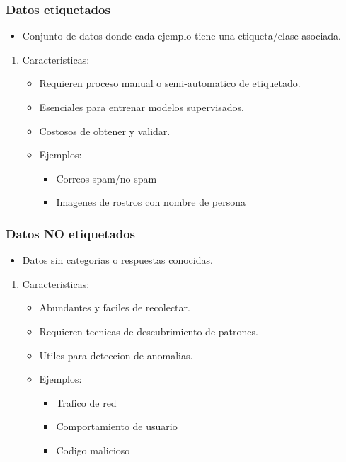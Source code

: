 \documentclass[11pt]{article}
\begin{document}
\subsubsection{Datos etiquetados}
\label{sec:org62e848c}
\begin{itemize}
\item Conjunto de datos donde cada ejemplo tiene una etiqueta/clase asociada.
\end{itemize}
\begin{enumerate}
\item Caracteristicas:
\label{sec:orgd0149be}
\begin{itemize}
\item Requieren proceso manual o semi-automatico de etiquetado.
\item Esenciales para entrenar modelos supervisados.
\item Costosos de obtener y validar.
\item Ejemplos:
\begin{itemize}
\item Correos spam/no spam
\item Imagenes de rostros con nombre de persona
\end{itemize}
\end{itemize}
\end{enumerate}
\subsubsection{Datos NO etiquetados}
\label{sec:orgfcffd6f}
\begin{itemize}
\item Datos sin categorias o respuestas conocidas.
\end{itemize}
\begin{enumerate}
\item Caracteristicas:
\label{sec:org9862a7b}
\begin{itemize}
\item Abundantes y faciles de recolectar.
\item Requieren tecnicas de descubrimiento de patrones.
\item Utiles para deteccion de anomalias.
\item Ejemplos:
\begin{itemize}
\item Trafico de red
\item Comportamiento de usuario
\item Codigo malicioso
\end{itemize}
\end{itemize}
\end{enumerate}
\end{document}
